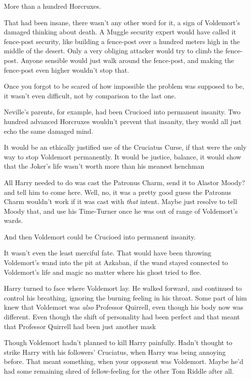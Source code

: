 More than a hundred Horcruxes.

That had been insane, there wasn't any other word for it, a sign of Voldemort's
damaged thinking about death. A Muggle security expert would have called it
fence-post security, like building a fence-post over a hundred meters high in
the middle of the desert. Only a very obliging attacker would try to climb the
fence-post. Anyone sensible would just walk around the fence-post, and making
the fence-post even higher wouldn't stop that.

Once you forgot to be scared of how impossible the problem was supposed to be,
it wasn't even difficult, not by comparison to the last one.

Neville's parents, for example, had been Crucioed into permanent insanity. Two
hundred advanced Horcruxes wouldn't prevent that insanity, they would all just
echo the same damaged mind.

It would be an ethically justified use of the Cruciatus Curse, if that were the
only way to stop Voldemort permanently. It would be justice, balance, it would
show that the Joker's life wasn't worth more than his meanest henchman{\el}

All Harry needed to do was cast the Patronus Charm, send it to{\el} Alastor
Moody?{\el} and tell him to come here. Well, no, it was a pretty good guess
the Patronus Charm wouldn't work if it was cast with \emph{that} intent. Maybe
just resolve to tell Moody that, and use his Time-Turner once he was out of
range of Voldemort's wards.

And then Voldemort could be Crucioed into permanent insanity.

It wasn't even the least merciful fate. That would have been throwing
Voldemort's wand into the pit at Azkaban, if the wand stayed connected to
Voldemort's life and magic no matter where his ghost tried to flee.

Harry turned to face where Voldemort lay. He walked forward, and continued to
control his breathing, ignoring the burning feeling in his throat. Some part of
him knew that Voldemort was \emph{also} Professor Quirrell, even though his
body now was different. Even though the shift of personality had been perfect
and that meant that Professor Quirrell had been just another mask{\el}

Though Voldemort hadn't planned to kill Harry painfully. Hadn't thought to
strike Harry with his followers' Cruciatus, when Harry was being annoying
before. That meant something, when your opponent was Voldemort. Maybe he'd had
some remaining shred of fellow-feeling for the other Tom Riddle after all.

